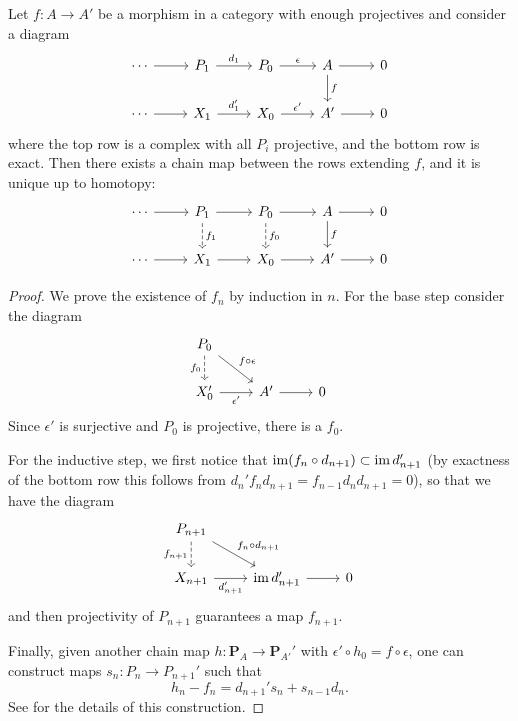 \begin{thm}\label{thm comparison for projectives}
    Let $f:A\to A'$ be a morphism in a category with enough projectives and consider a diagram
    \[\begin{tikzcd}
        \cdots\arrow[r] & P_1\arrow[r,"d_1"] & P_0 \arrow[r,"\epsilon"] & A\arrow[d,"f"]\arrow[r] & 0 \\
       \cdots\arrow[r] & X_1\arrow[r,"d_1'"] & X_0\arrow[r,"\epsilon'"] &A' \arrow[r] &0
    \end{tikzcd}\]
    where the top row is a complex with all $P_i$ projective, and the bottom row is exact. Then there exists a chain map between the rows extending $f$, and it is unique up to homotopy:
    \[\begin{tikzcd}
        \cdots\arrow[r] & P_1\arrow[r]\arrow[d,dashed,"f_1"] & P_0 \arrow[r]\arrow[d,dashed,"f_0"] & A\arrow[d,"f"]\arrow[r] & 0 \\
       \cdots\arrow[r] & X_1\arrow[r] & X_0\arrow[r] &A' \arrow[r] &0
    \end{tikzcd}\]
\end{thm}
\begin{proof}
     We prove the existence of $f_n$ by induction in $n$. For the base step consider the diagram
     \[\begin{tikzcd}
        P_0 \ar[d,dashed,swap,"f_0"]\ar[dr,"f\circ\epsilon"] & &\\
        X_0' \ar[r,swap,"\epsilon'"]& A'\ar[r] & 0
     \end{tikzcd}\]
     Since $\epsilon'$ is surjective and $P_0$ is projective, there is a $f_0$.
     
     For the inductive step, we first notice that $\operatorname{im} (f_n\circ d_{n+1})\subset \operatorname{im} d_{n+1}'$ (by exactness of the bottom row this follows from $d_n'f_n d_{n+1}=f_{n-1}d_nd_{n+1}=0$), so that we have the diagram
     \[\begin{tikzcd}
        P_{n+1} \ar[d,dashed,swap,"f_{n+1}"]\ar[dr,"f_n\circ d_{n+1}"] & &\\
        X_{n+1} \ar[r,swap,"d_{n+1}'"]& \im d_{n+1}'\ar[r] & 0
     \end{tikzcd}\]
     and then projectivity of $P_{n+1}$ guarantees a map $f_{n+1}$.
     
     Finally, given another chain map $h:\bm{P}_A\to \bm{P}_{A'}'$ with $\epsilon '\circ h_0=f\circ\epsilon$, one can construct maps $s_n:P_n\to P_{n+1}'$ such that
     \[h_n-f_n=d_{n+1}'s_n+s_{n-1}d_n.\]
     See \cite[Thm. 6.16]{Rotman} for the details of this construction.
\end{proof}


